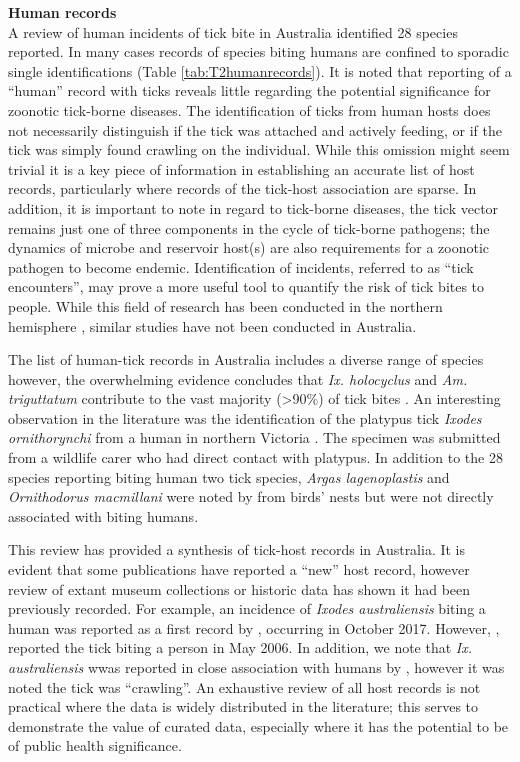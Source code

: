 \documentclass[a4paper, nobind]{templates/ociamthesis}
\begin{document}
\textbf{Human records}\\
A review of human incidents of tick bite in Australia identified 28 species reported.
In many cases records of species biting humans are confined to sporadic single identifications (Table \ref{tab:T2humanrecords}).
It is noted that reporting of a ``human'' record with ticks reveals little regarding the potential significance for zoonotic tick-borne diseases.
The identification of ticks from human hosts does not necessarily distinguish if the tick was attached and actively feeding, or if the tick was simply found crawling on the individual.
While this omission might seem trivial it is a key piece of information in establishing an accurate list of host records, particularly where records of the tick-host association are sparse.
In addition, it is important to note in regard to tick-borne diseases, the tick vector remains just one of three components in the cycle of tick-borne pathogens; the dynamics of microbe and reservoir host(s) are also requirements for a zoonotic pathogen to become endemic.
Identification of incidents, referred to as ``tick encounters'', may prove a more useful tool to quantify the risk of tick bites to people.
While this field of research has been conducted in the northern hemisphere \autocite{hookHumanTickEncounters2021}, similar studies have not been conducted in Australia.

The list of human-tick records in Australia includes a diverse range of species however, the overwhelming evidence concludes that \emph{Ix. holocyclus} and \emph{Am. triguttatum} contribute to the vast majority (\textgreater90\%) of tick bites \autocite{goftonBacterialProfilingReveals2015,geary30YearsSamples2020}.
An interesting observation in the literature was the identification of the platypus tick \emph{Ixodes ornithorynchi} from a human in northern Victoria \autocite{geary30YearsSamples2020}. The specimen was submitted from a wildlife carer who had direct contact with platypus. In addition to the 28 species reporting biting human two tick species, \emph{Argas lagenoplastis} and \emph{Ornithodorus macmillani} were noted by \textcite{geary30YearsSamples2020} from birds' nests but were not directly associated with biting humans.

This review has provided a synthesis of tick-host records in Australia.
It is evident that some publications have reported a ``new'' host record, however review of extant museum collections or historic data has shown it had been previously recorded.
For example, an incidence of \emph{Ixodes australiensis} biting a human was reported as a first record by \textcite{kwakFirstRecordsHuman2018}, occurring in October 2017.
However, \textcite{rabyNewFociSpotted2016}, reported the tick biting a person in May 2006.
In addition, we note that \emph{Ix. australiensis} wwas reported in close association with humans by \textcite{robertsAustralianTicks1970}, however it was noted the tick was ``crawling''. An exhaustive review of all host records is not practical where the data is widely distributed in the literature; this serves to demonstrate the value of curated data, especially where it has the potential to be of public health significance.
\end{document}
